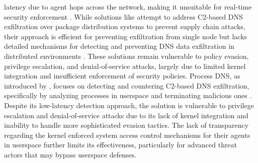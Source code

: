 \documentclass [11pt, proquest] {uwthesis}[2020/02/24]
\begin{document}
latency due to agent hops across the network, making it unsuitable for real-time security enforcement \cite{9486400}. While solutions like \citeauthor{haider2024c2}  attempt to address C2-based DNS exfiltration over package distribution systems to prevent supply chain attacks, their approach is efficient for preventing exfiltration from single node but lacks detailed mechanisms for detecting and preventing DNS data exfiltration in distributed environments \cite{haider2024c2,sivakorn2019countering}. These solutions remain vulnerable to policy evasion, privilege escalation, and denial-of-service attacks, largely due to limited kernel integration and insufficient enforcement of security policies. Process DNS, as introduced by \citeauthor{sivakorn2019countering}, focuses on detecting and countering C2-based DNS exfiltration, specifically by analyzing processes in userspace and terminating malicious ones \cite{sivakorn2019countering}. Despite its low-latency detection approach, the solution is vulnerable to privilege escalation and denial-of-service attacks due to its lack of kernel integration and inability to handle more sophisticated evasion tactics. The lack of transparency regarding the kernel enforced system access control mechanisms for their agents in userspace further limits its effectiveness, particularly for advanced threat actors that may bypass userspace defenses.
\end{document}
